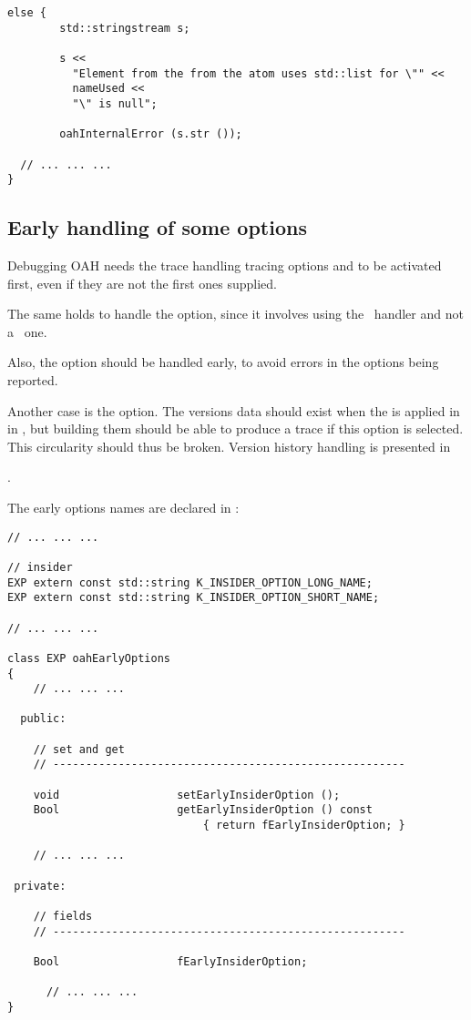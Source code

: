 {\begin{lstlisting}[language=CPlusPlus]
      else {
        std::stringstream s;

        s <<
          "Element from the from the atom uses std::list for \"" <<
          nameUsed <<
          "\" is null";

        oahInternalError (s.str ());

  // ... ... ...
}
\end{lstlisting}


\subsection{Early handling of some options}

Debugging OAH needs the trace handling tracing options  and  to be activated first, even if they are not the first ones supplied.

The same holds to handle the  option, since it involves using the \insider\ handler and not a \regular\ one.

Also, the  option should be handled early, to avoid errors in the options being reported.

Another case is the  option. The versions data should exist when the  is applied in  in , but building them should be able to produce a trace if this option is selected. This circularity  should thus be broken. Version history handling is presented in }.

The early options names are declared in :
\begin{lstlisting}[language=Terminal]
// ... ... ...

// insider
EXP extern const std::string K_INSIDER_OPTION_LONG_NAME;
EXP extern const std::string K_INSIDER_OPTION_SHORT_NAME;

// ... ... ...

class EXP oahEarlyOptions
{
	// ... ... ...

  public:

    // set and get
    // ------------------------------------------------------

    void                  setEarlyInsiderOption ();
    Bool                  getEarlyInsiderOption () const
                              { return fEarlyInsiderOption; }

	// ... ... ...

 private:

    // fields
    // ------------------------------------------------------

    Bool                  fEarlyInsiderOption;

	  // ... ... ...
}
\end{lstlisting}

